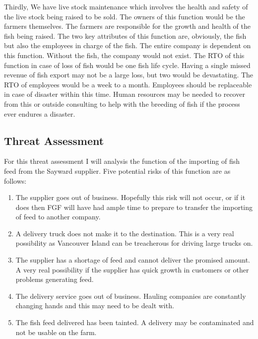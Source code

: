 \documentclass[paper=a4, fontsize=11pt]{scrartcl} %
\numberwithin{equation}{section} %
\numberwithin{figure}{section} %
\numberwithin{table}{section} %
\begin{document}
Thirdly, We have live stock maintenance which
involves the health and safety of the live stock being raised to be sold. The owners of this
function would be the farmers themselves. The farmers are responsible for the growth and
health of the fish being raised. The two key attributes of this function are, obviously, the
fish but also the employees in charge of the fish. The entire company is dependent on this 
function. Without the fish, the company would not exist. The RTO of this function in case 
of loss of fish would be one fish life cycle. Having a single missed revenue of fish export
may not be a large loss, but two would be devastating. The RTO of employees would be a week
to a month. Employees should be replaceable in case of disaster within this time. Human 
resources may be needed to recover from this or outside consulting to help with the
breeding of fish if the process ever endures a disaster.\\

\subsection{Threat Assessment}

For this threat assessment I will analysis the function of the importing of fish feed
from the Sayward supplier. Five potential risks of this function are as follows:

\begin{enumerate}

\item The supplier goes out of business. Hopefully this risk will not occur, or if it
does then FGF will have had ample time to prepare to transfer the importing of feed to 
another company.
\item A delivery truck does not make it to the destination. This is a very real possibility
as Vancouver Island can be treacherous for driving large trucks on.
\item The supplier has a shortage of feed and cannot deliver the promised amount. A 
very real possibility if the supplier has quick growth in customers or other problems
generating feed.
\item The delivery service goes out of business. Hauling companies are constantly
changing hands and this may need to be dealt with.
\item The fish feed delivered has been tainted. A delivery may be contaminated and not
be usable on the farm.

\end{enumerate}
\end{document}
